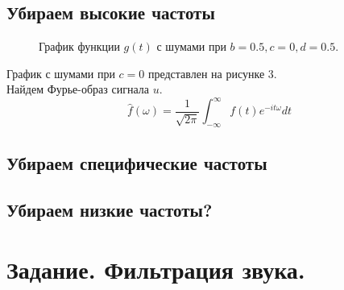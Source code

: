 \documentclass[a5paper, 10pt]{article}
\theoremstyle{definition}
\theoremstyle{plain}
\theoremstyle{remark}
\begin{document}
\subsection{Убираем высокие частоты}

\begin{figure}[h!]
\caption{График функции $g(t)$ с шумами при $b = 0.5, c = 0, d = 0.5$.}
\end{figure}

График с шумами при $c= 0$ представлен на рисунке 3. \\
Найдем Фурье-образ сигнала $u$.
\begin{equation}
\hat{f}(\omega) = \frac{1}{\sqrt{2 \pi}} \int_{-\infty}^{\infty} f(t) e^{-i t \omega} dt
\end{equation}








\subsection{Убираем специфические частоты}










\subsection{Убираем низкие частоты?}





\newpage
\section{Задание. Фильтрация звука.}



\end{document}

